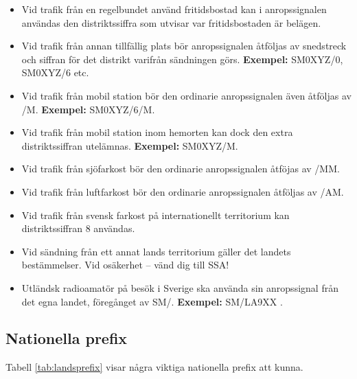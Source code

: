 \begin{itemize}
\item Vid trafik från en regelbundet använd fritidsbostad kan i
  anropssignalen användas den distriktssiffra som utvisar var
  fritidsbostaden är belägen.

\item Vid trafik från annan tillfällig plats bör anropssignalen
  åtföljas av snedstreck och siffran för det distrikt varifrån
  sändningen görs.
  \textbf{Exempel:} SM0XYZ/0, SM0XYZ/6 etc.

\item Vid trafik från mobil station bör den ordinarie anropssignalen
  även åtföljas av /M.
  \textbf{Exempel:} SM0XYZ/6/M.

\item Vid trafik från mobil station inom hemorten kan dock den extra
  distriktssiffran utelämnas.
  \textbf{Exempel:} SM0XYZ/M.

\item Vid trafik från sjöfarkost bör den ordinarie anropssignalen
 åtföjas av /MM.

\item Vid trafik från luftfarkost bör den ordinarie anropssignalen
  åtföljas av /AM.

\item Vid trafik från svensk farkost på internationellt territorium
 kan distriktssiffran 8 användas.

\item Vid sändning från ett annat lands territorium gäller det landets
  bestämmelser.
  Vid osäkerhet -- vänd dig till SSA!

\item Utländsk radioamatör på besök i Sverige ska använda sin
  anropssignal från det egna landet, föregånget av SM/. \textbf{Exempel:} SM/LA9XX \cite{TR6101}.
\end{itemize}

\subsection{Nationella prefix}

Tabell \ref{tab:landsprefix} visar några viktiga nationella prefix att kunna.

